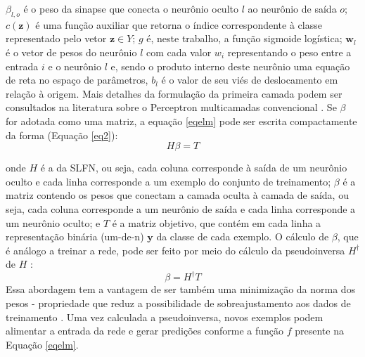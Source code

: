 $\beta_{l,o}$ é o peso da sinapse que conecta o neurônio oculto $l$ ao neurônio de saída $o$;
$c(\bm{z})$ é uma função auxiliar que retorna o índice correspondente à classe
representado pelo vetor $\bm{z} \in Y$;
$g$ é, neste trabalho, a função sigmoide logística;
$\bm{w}_l$ é o vetor de pesos do neurônio $l$ com cada valor $w_i$ representando o peso entre a
entrada $i$ e o neurônio $l$ e, sendo o produto interno deste neurônio uma equação de reta no
espaço de parâmetros, $b_l$ é o valor de seu viés de deslocamento em relação à origem.
Mais detalhes da formulação da primeira camada podem ser consultados na literatura sobre o
Perceptron multicamadas convencional \citep{haykin2004comprehensive}.
Se $\beta$ for adotada como uma matriz, a equação \ref{eqelm} pode ser escrita compactamente da
forma (Equação \ref{eq2}):
\begin{equation} \label{eq2}
H \beta = T
\end{equation}

onde $H$ é a  da SLFN,
ou seja, cada coluna corresponde à saída de um neurônio oculto e cada linha corresponde a um
exemplo do conjunto de treinamento;
$\beta$ é a matriz contendo os pesos que conectam a camada oculta à camada de saída, ou seja, cada
coluna corresponde a um neurônio de saída e cada linha corresponde a um neurônio oculto;
e $T$ é a matriz objetivo, que contém em cada linha a
representação binária (um-de-n) $\bm{y}$ da classe de cada exemplo.
O cálculo de $\beta$, que é análogo a treinar a rede,
pode ser feito por meio do cálculo da pseudoinversa $H^{\dagger}$ de $H$
\citep{rao1971generalized}:
\begin{equation} \label{eq3}
\beta = H^{\dagger} T
\end{equation}
Essa abordagem tem a vantagem de ser também uma minimização da norma dos pesos -
propriedade que reduz a possibilidade de sobreajustamento aos dados de treinamento
\citep{journals/tit/Bartlett98}.
Uma vez calculada a pseudoinversa,
novos exemplos podem alimentar a entrada da rede e gerar predições conforme a função $f$
presente na Equação \ref{eqelm}.


